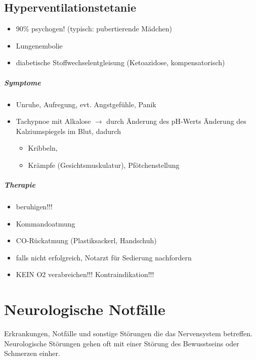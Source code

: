 \subsection{Hyperventilationstetanie}\label{topic:hyperventilationstetanie}
\begin{itemize}
\item 90\% psychogen! (typisch: pubertierende  Mädchen)
\item Lungenembolie
\item diabetische Stoffwechselentgleisung (Ketoazidose, kompensatorisch)
\end{itemize}


\subparagraph{Symptome}

\begin{itemize}
\item Unruhe, Aufregung, evt. Angstgefühle, Panik
\item Tachypnoe mit Alkalose $\rightarrow$ durch Änderung
des pH-Werts Änderung des Kalziumspiegels im Blut, dadurch
\begin{itemize}
    \item Kribbeln, 
\item Krämpfe (Gesichtsmuskulatur),  Pfötchenstellung
\end{itemize}
\end{itemize}

\subparagraph{Therapie}

\begin{itemize}
\item {\mdseries
beruhigen!!!}

\item {\mdseries
Kommandoatmung}

\item {\mdseries
CO-R\"uckatmung  (Plastiksackerl,  Handschuh)}

\item {\mdseries
falls nicht erfolgreich, Notarzt f\"ur Sedierung  nachfordern}

\item {\mdseries
KEIN O{2}  verabreichen!!! Kontraindikation!!!}

\end{itemize}







\section{Neurologische Notfälle}
Erkrankungen, Notfälle und sonstige Störungen die das Nervensystem betreffen. Neurologische Störungen gehen oft mit einer Störung des Bewusstseins
oder Schmerzen einher.

